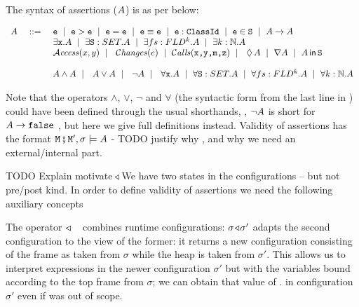 \begin{definition}[Assertions]The syntax of assertions ($A$) is as per below:
\label{def:assertions}

$ ~ $ \\

$\begin{array}{lcl}
\A &\ ::=\  &   \SE  \ \mid \ \SE > \SE \ \mid \  \SE=\SE  \ \mid \ \SE \equiv \SE\ \mid \   \SE:\prg{ClassId}  \ \mid \   
    \SE\in\prg{S}   \ \mid  \ \A \rightarrow \A  \\
 &   &  \exists \x.\A  \ \mid \  \exists \prg{S}:SET.\A  \ \mid \  \exists fs:FLD^k.\A
 \ \mid \  \exists k:\mathbb{N}.\A  
\\
 &    & \CanAccess x y \ \mid\  \ \Changes e \ \mid\  \Calls{\prg{x},\prg{y},\prg{m},\prg{z}} \ \mid\  \  \Future \A  \ \mid \  \Past \A \ \mid \ \Using \A \prg{S }
 \\
 \\
  &   &  \A \wedge \A  \ \mid\  \ \A \vee \A  \ \mid\  \ \neg A   \ \mid\  \ \forall \x.\A  \ \mid \  \forall \prg{S}:SET.\A  \ \mid \  \forall fs:FLD^k.\A
 \ \mid \  \forall k:\mathbb{N}.\A  
\\

\end{array}$


\end{definition} 

Note that the operators $\wedge$, $\vee$,  $\neg$ and $\forall$  (\ie the syntactic form from the last line  in  ) could have been defined  through the usual shorthands, \eg, $\neg A$ is short for 
$A \rightarrow {\mbox{\tt{false}}}$ \etc, but here we give full definitions instead.
 Validity of assertions has the format ${\mbox{\tt{\ensuremath{{\mbox{\tt{M}}}}}}}\fatsemi {\mbox{\tt{\ensuremath{{\mbox{\tt{M}}}}}}}', \sigma \models A$ - TODO justify why \M, and why we need an external/internal part.
 
TODO Explain motivate $\!\triangleleft\!$ We have two states in the configurations -- but not pre/post kind.
In order to define validity of assertions we need   the following auxiliary concepts

The operator\  $\!\triangleleft\!$ \ \ combines runtime configurations: $\sigma \!\triangleleft\! \sigma'$ adapts the second configuration to the view of the former: it returns a new configuration consisting of the frame as taken from $\sigma$ while the heap is taken from $\sigma'$. This allows us to interpret expressions  in the newer configuration $\sigma'$ but with the variables bound according to the top frame from $\sigma$; \eg we can obtain that value of . in configuration  $\sigma'$ even if  was out of scope.
 

